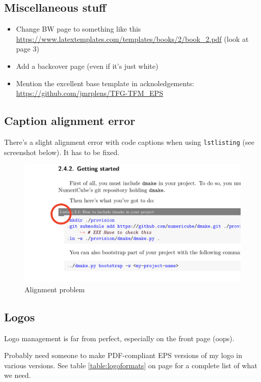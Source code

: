 \subsection{Miscellaneous stuff}

\begin{itemize}
    \item Change BW page to something like this \url{https://www.latextemplates.com/templates/books/2/book_2.pdf} (look at page 3)
    \item Add a backcover page (even if it's just white)
    \item Mention the excellent base template in acknoledgements: \url{https://github.com/jmrplens/TFG-TFM_EPS}
\end{itemize}

\subsection{Caption alignment error}

There's a slight alignment error with code captions when using \texttt{lstlisting} (see screenshot below). It has to be fixed.

\begin{figure}
\includegraphics[width=\textwidth]{assets/alignmentpb.png}
\caption{Alignment problem}
\end{figure}


\subsection{Logos}

Logo management is far from perfect, especially on the front page (oops).

Probably need someone to make PDF-compliant EPS versions of my logo in various versions. See table \ref{table:logoformats} on page \pageref{table:logoformats} for a complete list of what we need.

